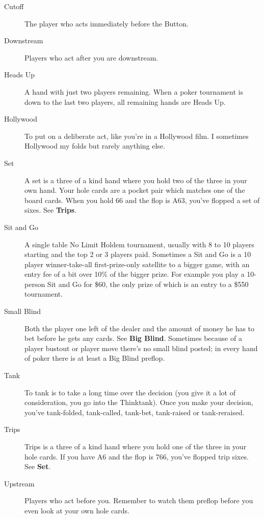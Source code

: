 \begin{description}
\item[Cutoff] The player who acts immediately before the Button.

\item[Downstream] Players who act after you are downstream.

\item[Heads Up] A hand with just two players remaining. When a poker tournament
is down to the last two players, all remaining hands are Heads Up.

\item[Hollywood] To put on a deliberate act, like you're in a Hollywood film. I
sometimes Hollywood my folds but rarely anything else.

\item[Set] A set is a three of a kind hand where you hold two of the three in your
own hand. Your hole cards are a pocket pair which matches one of the board cards.
When you hold 66 and the flop is A63, you've flopped a set of sixes. See \textbf{Trips}.

\item[Sit and Go] A single table No Limit Holdem tournament, usually with 8 to 10
players starting and the top 2 or 3 players paid. Sometimes a Sit and Go is
a 10 player winner-take-all first-prize-only satellite to a bigger game,
with an entry fee of a bit over 10\% of the bigger prize. For
example you play a 10-person Sit and Go for \$60, the only prize of which
is an entry to a \$550 tournament.

\item[Small Blind] Both the player one left of the dealer and the amount of money he
has to bet before he gets any cards. See \textbf{Big Blind}. Sometimes
because of a player bustout or player move there's no small blind posted;
in every hand of poker there is at least a Big Blind preflop.

\item[Tank] To tank is to take a long time over the decision
(you give it a lot of consideration, you go into the Thinktank).
Once you make your decision, you've tank-folded, tank-called, tank-bet,
tank-raised or tank-reraised.

\item[Trips] Trips is a three of a kind hand where you hold one of the three in your
hole cards. If you have A6 and the flop is 766, you've flopped trip sixes. See \textbf{Set}.

\item[Upstream] Players who act before you. Remember to watch them preflop before
you even look at your own hole cards.

\end{description}
